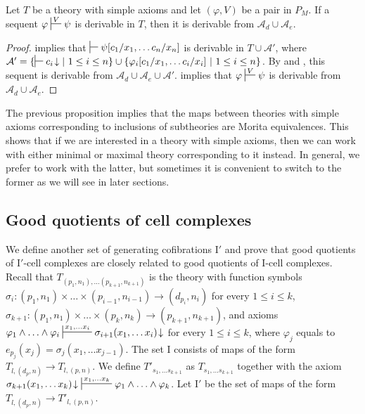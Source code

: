 \documentclass[reqno]{amsart}
\theoremstyle{definition}
\theoremstyle{remark}
\newcommand{\I}{\mathrm{I}}
\numberwithin{figure}{section}
\begin{document}
\begin{prop}
Let $T$ be a theory with simple axioms and let $(\varphi,V)$ be a pair in $P_M$.
If a sequent $\varphi \sststile{}{V} \psi$ is derivable in $T$, then it is derivable from $\mathcal{A}_d \cup \mathcal{A}_e$.
\end{prop}
\begin{proof}
 implies that $\sststile{}{} \psi[c_1/x_1, \ldots c_n/x_n]$ is derivable in $T \cup \mathcal{A}'$, where $\mathcal{A}' = \{ \sststile{}{} c_i\!\downarrow |\ 1 \leq i \leq n \} \cup \{ \varphi_i[c_1/x_1, \ldots c_i/x_i]\ |\ 1 \leq i \leq n \}$.
By  and , this sequent is derivable from $\mathcal{A}_d \cup \mathcal{A}_e \cup \mathcal{A}'$.
 implies that $\varphi \sststile{}{V} \psi$ is derivable from $\mathcal{A}_d \cup \mathcal{A}_e$.
\end{proof}

The previous proposition implies that the maps between theories with simple axioms corresponding to inclusions of subtheories are Morita equivalences.
This shows that if we are interested in a theory with simple axioms, then we can work with either minimal or maximal theory corresponding to it instead.
In general, we prefer to work with the latter, but sometimes it is convenient to switch to the former as we will see in later sections.

\subsection{Good quotients of cell complexes}

We define another set of generating cofibrations $\I'$ and prove that good quotients of $\I'$-cell complexes are closely related to good quotients of $\I$-cell complexes.
Recall that $T_{(p_1,n_1), \ldots (p_{k+1},n_{k+1})}$ is the theory with function symbols $\sigma_i : (p_1,n_1) \times \ldots \times (p_{i-1},n_{i-1}) \to (d_{p_i},n_i)$ for every $1 \leq i \leq k$,
$\sigma_{k+1} : (p_1,n_1) \times \ldots \times (p_k,n_k) \to (p_{k+1},n_{k+1})$, and axioms $\varphi_1 \land \ldots \land \varphi_i \sststile{}{x_1, \ldots x_i} \sigma_{i+1}(x_1, \ldots x_i)\!\downarrow$ for every $1 \leq i \leq k$,
where $\varphi_j$ equals to $e_{p_j}(x_j) = \sigma_j(x_1, \ldots x_{j-1})$.
The set $\I$ consists of maps of the form $T_{l, (d_p,n)} \to T_{l, (p,n)}$.
We define $T'_{s_1, \ldots s_{k+1}}$ as $T_{s_1, \ldots s_{k+1}}$ together with the axiom $\sigma_{k+1}(x_1, \ldots x_k)\!\downarrow\ \sststile{}{x_1, \ldots x_k} \varphi_1 \land \ldots \land \varphi_k$.
Let $\I'$ be the set of maps of the form $T_{l, (d_p,n)} \to T'_{l, (p,n)}$.
\end{document}
